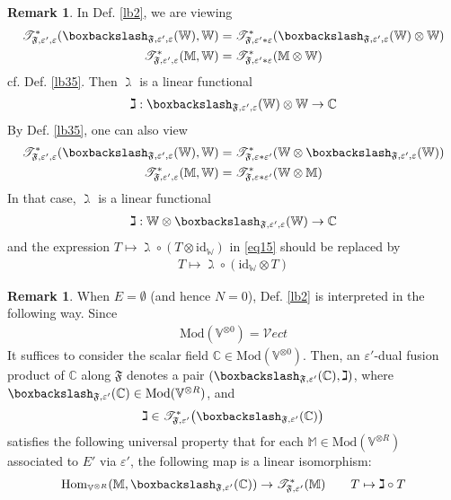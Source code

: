 \documentclass[11pt,b5paper,notitlepage]{article}
\theoremstyle{definition}
\newtheorem{rem}[df]{Remark}
\theoremstyle{plain}
\newcommand{\fk}{\mathfrak}
\newcommand{\Hom}{\mathrm{Hom}}
\newcommand{\Vect}{\mathcal Vect}
\newcommand{\scr}{\mathscr}
\newcommand{\Vbb}{\mathbb V}
\newcommand{\Wbb}{\mathbb W}
\newcommand{\Mbb}{\mathbb M}
\newcommand{\Cbb}{\mathbb C}
\newcommand{\<}{\left\langle}
\renewcommand{\>}{\right\rangle}
\newcommand{\ST}{\mathscr{T}}
\newcommand{\bbs}{\boxbackslash}
\newcommand{\Mod}{\mathrm{Mod}}
\newcommand{\id}{\mathrm{id}}
\newcommand{\eps}{\varepsilon}
\newcommand{\ff}{\mathfrak{F}}
\numberwithin{equation}{section}
\begin{document}
\begin{rem}
In Def. \ref{lb2}, we are viewing
\begin{gather*}
\ST_{\fk F,\eps',\eps}^*(\bbs_{\fk F,\eps',\eps}(\Wbb),\Wbb)=\ST_{\fk F,\eps'*\eps}^*(\bbs_{\fk F,\eps',\eps} (\Wbb)\otimes\Wbb)\\
\scr T_{\fk F,\eps',\eps}^*(\Mbb,\Wbb)=\scr T_{\fk F,\eps'*\eps}^*(\Mbb\otimes\Wbb)
\end{gather*}
cf. Def. \ref{lb35}. Then $\gimel$ is a linear functional
\begin{align*}
\gimel:\bbs_{\fk F,\eps',\eps}(\Wbb)\otimes\Wbb\rightarrow\Cbb
\end{align*}
By Def. \ref{lb35}, one can also view
\begin{gather*}
\ST_{\fk F,\eps',\eps}^*(\bbs_{\fk F,\eps',\eps}(\Wbb),\Wbb)=\ST_{\fk F,\eps*\eps'}^*(\Wbb\otimes\bbs_{\fk F,\eps',\eps} (\Wbb))\\
\scr T_{\fk F,\eps',\eps}^*(\Mbb,\Wbb)=\scr T_{\fk F,\eps*\eps'}^*(\Wbb\otimes\Mbb)
\end{gather*}
In that case, $\gimel$ is a linear functional
\begin{align*}
\gimel:\Wbb\otimes\bbs_{\fk F,\eps',\eps}(\Wbb)\rightarrow\Cbb
\end{align*}
and the expression $ T\mapsto \gimel\circ(T\otimes\id_\Wbb)$ in \eqref{eq15} should be replaced by
\begin{align*}
T\mapsto\gimel\circ(\id_\Wbb\otimes T)
\end{align*}
\end{rem}


\begin{rem}\label{lb39}
When $E=\emptyset$ (and hence $N=0$), Def. \ref{lb2} is interpreted in the following way. Since
\begin{align*}
\Mod(\Vbb^{\otimes 0})=\Vect
\end{align*}
It suffices to consider the scalar field $\Cbb\in\Mod(\Vbb^{\otimes 0})$. Then, an $\eps'$-dual fusion product of $\Cbb$ along $\ff$ denotes a pair $(\bbs_{\ff,\eps'}(\Cbb),\gimel)$, where $\bbs_{\ff,\eps'}(\Cbb)\in\Mod(\Vbb^{\otimes R})$, and
\begin{align*}
\gimel\in\ST^*_{\ff,\eps'}\big(\bbs_{\ff,\eps'}(\Cbb)\big)
\end{align*}
satisfies the following universal property that for each $\Mbb\in\Mod(\Vbb^{\otimes R})$ associated to $E'$ via $\eps'$, the following map is a linear isomorphism:
\begin{align}
\Hom_{\Vbb^{\otimes R}}(\Mbb,\bbs_{\fk F,\eps'} (\Cbb))\rightarrow \scr T_{\fk F,\eps'}^*(\Mbb)\qquad T\mapsto \gimel\circ T
\end{align}
\end{rem}
\end{document}
